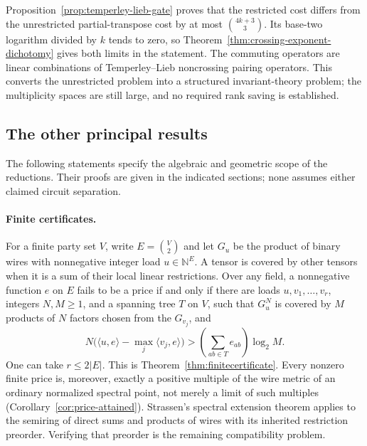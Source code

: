 \documentclass[11pt,a4paper]{article}
\newcommand{\N}{\mathbb N}
\theoremstyle{definition}
\theoremstyle{remark}
\begin{document}
Proposition~\ref{prop:temperley-lieb-gate} proves that the restricted
cost differs from the unrestricted partial-transpose cost by at most
$\binom{4k+3}{3}$. Its base-two logarithm divided by $k$ tends to
zero, so Theorem~\ref{thm:crossing-exponent-dichotomy} gives both
limits in the statement. The commuting operators are linear combinations
of Temperley--Lieb noncrossing pairing operators. This converts the
unrestricted problem into a structured invariant-theory problem;
the multiplicity spaces are still large, and no required rank saving
is established.

\subsection{The other principal results}

The following statements specify the algebraic and geometric
scope of the reductions. Their proofs are given in the indicated
sections; none assumes either claimed circuit separation.

\paragraph{Finite certificates.}
For a finite party set $V$, write $E=\binom V2$ and let $G_u$
be the product of binary wires with nonnegative integer load
$u\in\N^E$. A tensor is covered by other tensors when it is a
sum of their local linear restrictions.
Over any field, a nonnegative function $e$ on $E$ fails to be
a price if and only if there are loads $u,v_1,\ldots,v_r$,
integers $N,M\geq1$, and a spanning tree $T$ on $V$, such that
$G_u^N$ is covered by $M$ products of $N$ factors chosen from
the $G_{v_j}$, and
\[
 N\bigl(\langle u,e\rangle-\max_j\langle v_j,e\rangle\bigr)
   >\left(\sum_{ab\in T}e_{ab}\right)\log_2M .
\]
One can take $r\leq2|E|$.
This is Theorem~\ref{thm:finitecertificate}.
Every nonzero finite price is, moreover, exactly a positive
multiple of the wire metric of an ordinary normalized spectral
point, not merely a limit of such multiples
(Corollary~\ref{cor:price-attained}).
Strassen's spectral extension theorem applies to the semiring
of direct sums and products of wires with its inherited
restriction preorder. Verifying that preorder is the remaining
compatibility problem.
\end{document}

